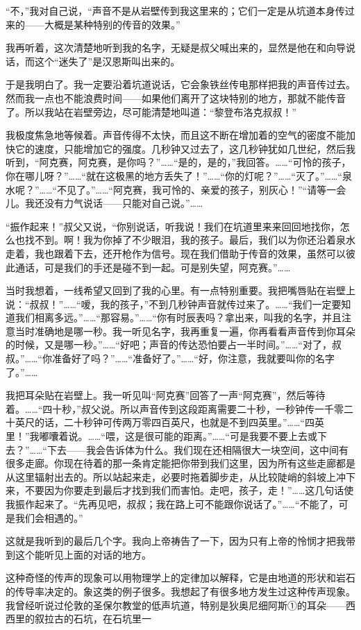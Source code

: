 \documentclass[10pt]{book}
\begin{document}
“不，”我对自己说，“声音不是从岩壁传到我这里来的；它们一定是从坑道本身传过来的——大概是某种特别的传音的效果。”

我再听着，这次清楚地听到我的名字，无疑是叔父喊出来的，显然是他在和向导说话，而这个“迷失了”是汉恩斯叫出来的。

于是我明白了。我一定要沿着坑道说话，它会象铁丝传电那样把我的声音传过去。然而我一点也不能浪费时间——如果他们离开了这块特别的地方，那就不能传音了。所以我站在岩壁旁边，尽可能清楚地叫道：“黎登布洛克叔叔！”

我极度焦急地等候着。声音传得不太快，而且这不断在增加着的空气的密度不能加快它的速度，只能增加它的强度。几秒钟又过去了，这几秒钟犹如几世纪，然后我听到，“阿克赛，阿克赛，是你吗？”……“是的，是的，”我回答。……“可怜的孩子，你在哪儿呀？”……“就在这极黑的地方丢失了！”……“你的灯呢？”……“灭了。”……“泉水呢？”……“不见了。”……“阿克赛，我可怜的、亲爱的孩子，别灰心！”“请等一会儿。我还没有力气说话——只能对自己说。”……

“振作起来！”叔父又说，“你别说话，听我说！我们在坑道里来来回回地找你，怎么也找不到。啊！我为你掉了不少眼泪，我的孩子。最后，我们以为你还沿着泉水走着，我也跟着下去，还开枪作为信号。现在我们借助于传音的效果，虽然可以彼此通话，可是我们的手还是碰不到一起。可是别失望，阿克赛。”……

当时我想着，一线希望又回到了我的心里。有一点特别重要。我把嘴唇贴在岩壁上说：“叔叔！”……“嗳，我的孩子，”不到几秒钟声音就传过来了。……“我们一定要知道我们相离多远。”……“那容易。”……“你有时辰表吗？拿出来，叫我的名字，并且注意当时准确地是哪一秒。我一听见名字，我再重复一遍，你再看看声音传到你耳朵的时候，又是哪一秒。”……“好吧；声音的传达恐怕要占一半时间。”……“对了，叔叔。”……“你准备好了吗？”……“准备好了。”……“好，你注意，我就要叫你的名字了。”……

我把耳朵贴在岩壁上。我一听见叫“阿克赛”回答了一声“阿克赛”，然后等待着。……“四十秒，”叔父说。所以声音传到这段距离需要二十秒，一秒钟传一千零二十英尺的话，二十秒钟可传两万零四百英尺，也就是不到四英里。”……“四英里！”我嘟囔着说。……“喂，这是很可能的距离。”……“可是我要不要上去或下去？”……“下去——我会告诉体为什么。我们现在还相隔很大一块空间，这中间有很多走廊。你现在待着的那一条肯定能把你带到我们这里，因为所有这些走廊都是从这里辐射出去的。所以站起来走，必要时拖着脚步走，从比较陡峭的斜坡上冲下来，不要因为你要走到最后才找到我们而害怕。走吧，孩子，走！”……这几句话使我振作起来了。“先再见吧，叔叔；我在路上可不能跟你说话了。”……“不能了，可是我们会相遇的。”

这就是我听到的最后几个字。我向上帝祷告了一下，因为只有上帝的怜悯才把我带到这个能听见上面的对话的地方。

这种奇怪的传声的现象可以用物理学上的定律加以解释，它是由地道的形状和岩石的传导率决定的。象这类的例子很多。我想起了有很多地方发生过这种传声现象。我曾经听说过伦敦的圣保尔教堂的低声坑道，特别是狄奥尼细阿斯①的耳朵——西西里的叙拉古的石坑，在石坑里一
\end{document}

